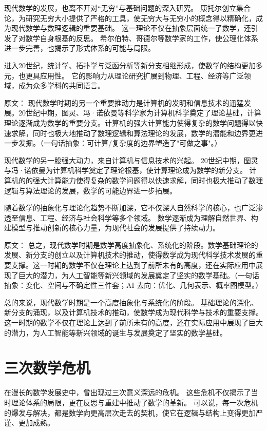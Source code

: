 现代数学的发展，也离不开对“无穷”与基础问题的深入研究。  
康托尔创立集合论，为研究无穷大小提供了严格的工具，使无穷大与无穷小的概念得以精确化，成为现代数学与数理逻辑的重要基础。  
这一理论不仅在抽象层面统一了数学，还引发了对数学自身根基的反思。  
希尔伯特、哥德尔等数学家的工作，使公理化体系进一步完善，也揭示了形式体系的可能与局限。

进入20世纪，统计学、拓扑学与泛函分析等新分支相继形成，使数学的结构更加多元，也更具应用性。  
它的影响力从理论研究扩展到物理、工程、经济等广泛领域，成为众多学科的共同语言。  

原文：
现代数学时期的另一个重要推动力是计算机的发明和信息技术的迅猛发展。20世纪中期，图灵、冯·诺依曼等科学家为计算机科学奠定了理论基础，计算理论逐渐成为数学的重要分支。计算机的强大计算能力使得复杂的数学问题得以快速求解，同时也极大地推动了数理逻辑和算法理论的发展，数学的潜能和边界更进一步发掘。{（一句话抽象：可计算/复杂度的边界塑造了"可做之事"。）}

现代数学的另一股强大动力，来自计算机与信息技术的兴起。  
20世纪中期，图灵与冯·诺依曼为计算机科学奠定了理论根基，使计算理论成为数学的新分支。  
计算机的的强大计算能力使得复杂的数学问题得以快速求解，同时也极大推动了数理逻辑与算法理论的发展，数学的可能边界进一步拓展。  

随着数学的抽象化与理论化趋势不断加深，它不仅深入自然科学的核心，也广泛渗透至信息、工程、经济与社会科学等多个领域。  
数学逐渐成为理解自然世界、构建模型与推动创新的核心力量，为现代社会的发展提供了持续动力。

原文：
总之，现代数学时期是数学高度抽象化、系统化的阶段。数学基础理论的发展、新分支的创立以及计算机技术的推动，使得数学成为现代科学技术发展的重要支撑。这一时期的数学不仅在理论上达到了前所未有的高度，还在实际应用中展现了巨大的潜力，为人工智能等新兴领域的发展奠定了坚实的数学基础。{（一句话抽象：变化、空间与不确定性三件套；AI 去向：优化、几何表示、概率图模型。）}

总的来说，现代数学时期是一个高度抽象化与系统化的阶段。  
基础理论的深化、新分支的涌现，以及计算机技术的推动，使数学成为现代科学与技术的重要支撑。  
这一时期的数学不仅在理论上达到了前所未有的高度，还在实际应用中展现了巨大的潜力，为人工智能等新兴领域的诞生与发展奠定了坚实的数学基础。

\section{三次数学危机}

在漫长的数学发展史中，曾出现过三次意义深远的危机。  
这些危机不仅揭示了当时理论体系的局限，更在反思与重建中推动了数学的革新。  
可以说，每一次危机的爆发与解决，都是数学向更高层次走去的契机，使它在逻辑与结构上变得更加严谨、更加成熟。

